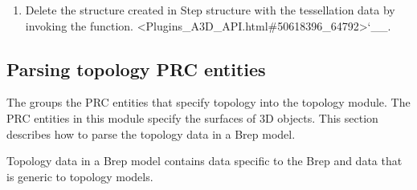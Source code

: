 \documentclass[letterpaper,12pt,english,openany,oneside]{sphinxmanual}
\begin{document}
\begin{sphinxVerbatim}[commandchars=\\\{\}]
 
\end{sphinxVerbatim}
\begin{enumerate}
%
\setcounter{enumi}{6}
\item {} 
Delete the  structure created in Step  structure with the tessellation data by invoking the  function. <Plugins\_A3D\_API.html\#50618396\_64792>`\_\_.

\end{enumerate}

\begin{sphinxVerbatim}[commandchars=\\\{\}]
 
\end{sphinxVerbatim}


\subsection{Parsing topology PRC entities}
\label{\detokenize{Plugins_A3D_API:parsing-topology-prc-entities}}
The  groups the PRC entities that specify topology into the topology module. The PRC entities in this module specify the surfaces of 3D objects. This section describes how to parse the topology data in a Brep model.

Topology data in a Brep model contains data specific to the Brep and data that is generic to topology models.

\end{document}
